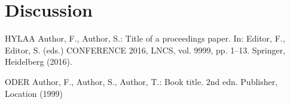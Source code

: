 \documentclass[runningheads]{llncs}
\begin{document}
\section{Discussion}

%
%
%
% 
% 
%
\begin{thebibliography}{8}


HYLAA Author, F., Author, S.: Title of a proceedings paper. In: Editor,
F., Editor, S. (eds.) CONFERENCE 2016, LNCS, vol. 9999, pp. 1--13.
Springer, Heidelberg (2016). 

ODER Author, F., Author, S., Author, T.: Book title. 2nd edn. Publisher,
Location (1999)

\end{thebibliography}
\end{document}
